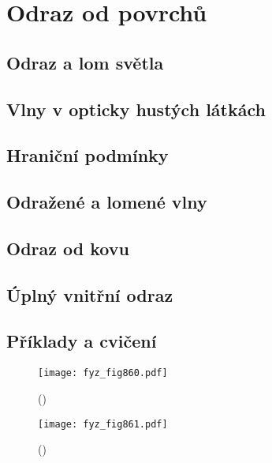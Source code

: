 \chapter{Odraz od povrchů}\label{fyz:IIchapXXXIII}
\minitoc
  \section{Odraz a lom světla}\label{fyz:IIchapXXXIIIsecI}
  \section{Vlny v opticky hustých látkách}\label{fyz:IIchapXXXIIIsecII}
  \section{Hraniční podmínky}\label{fyz:IIchapXXXIIIsecIII}
  \section{Odražené a lomené vlny}\label{fyz:IIchapXXXIIIsecIV}
  \section{Odraz od kovu}\label{fyz:IIchapXXXIIIsecV}
  \section{Úplný vnitřní odraz}\label{fyz:IIchapXXXIIIsecVI}
  \section{Příklady a cvičení}\label{fyz:IIchapXXXIIIsecVII}

    \begin{figure}[ht!] %
      \centering
      \texttt{[image: fyz\_fig860.pdf]}
      \caption{
               (\cite[s.~707]{Feynman02})}
      \label{fyz_fig860}
    \end{figure}

    \begin{figure}[ht!] %
      \centering
      \texttt{[image: fyz\_fig861.pdf]}
      \caption{
               (\cite[s.~707]{Feynman02})}
      \label{fyz_fig861}
    \end{figure}

